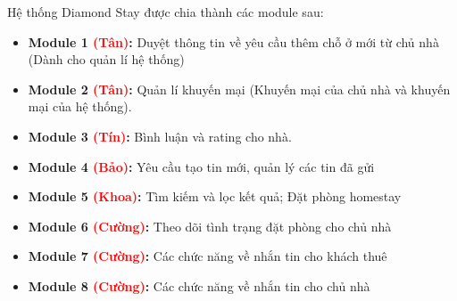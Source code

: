 Hệ thống Diamond Stay được chia thành các module sau:
\begin{itemize}
	\item \textbf{Module 1 \textcolor{red}{(Tân)}:} Duyệt thông tin về yêu cầu thêm chỗ ở mới từ chủ nhà (Dành cho quản lí hệ thống) 
	\item \textbf{Module 2 \textcolor{red}{(Tân)}:} Quản lí khuyến mại (Khuyến mại của chủ nhà và khuyến mại của hệ thống).
	\item \textbf{Module 3 \textcolor{red}{(Tín)}:} Bình luận và rating cho nhà.
	\item \textbf{Module 4 \textcolor{red}{(Bảo)}:} Yêu cầu tạo tin mới, quản lý các tin đã gửi 
	\item \textbf{Module 5 \textcolor{red}{(Khoa)}:} Tìm kiếm và lọc kết quả; Đặt phòng homestay 
	\item \textbf{Module 6 \textcolor{red}{(Cường)}:} Theo dõi tình trạng đặt phòng cho chủ nhà
	\item \textbf{Module 7 \textcolor{red}{(Cường)}:} Các chức năng về nhắn tin cho khách thuê
	\item \textbf{Module 8 \textcolor{red}{(Cường)}:} Các chức năng về nhắn tin cho chủ nhà 
\end{itemize}